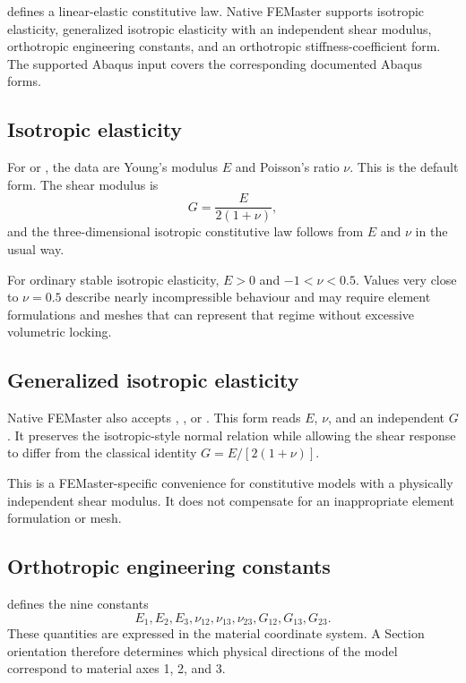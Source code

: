 
 defines a linear-elastic constitutive law. Native FEMaster supports isotropic elasticity, generalized isotropic elasticity with an independent shear modulus, orthotropic engineering constants, and an orthotropic stiffness-coefficient form. The supported Abaqus input covers the corresponding documented Abaqus forms.

\subsection*{Isotropic elasticity}

For  or , the data are Young's modulus \(E\) and Poisson's ratio \(\nu\). This is the default form. The shear modulus is
\[
G=\frac{E}{2(1+\nu)},
\]
and the three-dimensional isotropic constitutive law follows from \(E\) and \(\nu\) in the usual way.

For ordinary stable isotropic elasticity, \(E>0\) and \(-1<\nu<0.5\). Values very close to \(\nu=0.5\) describe nearly incompressible behaviour and may require element formulations and meshes that can represent that regime without excessive volumetric locking.

\subsection*{Generalized isotropic elasticity}

Native FEMaster also accepts , , or . This form reads \(E\), \(\nu\), and an independent \(G\). It preserves the isotropic-style normal relation while allowing the shear response to differ from the classical identity \(G=E/[2(1+\nu)]\).

This is a FEMaster-specific convenience for constitutive models with a physically independent shear modulus. It does not compensate for an inappropriate element formulation or mesh.

\subsection*{Orthotropic engineering constants}

 defines the nine constants
\[
E_1,E_2,E_3,\nu_{12},\nu_{13},\nu_{23},G_{12},G_{13},G_{23}.
\]
These quantities are expressed in the material coordinate system. A Section orientation therefore determines which physical directions of the model correspond to material axes 1, 2, and 3.

